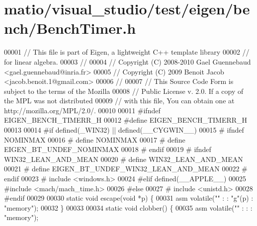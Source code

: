 \hypertarget{matio_2visual__studio_2test_2eigen_2bench_2_bench_timer_8h_source}{}\section{matio/visual\+\_\+studio/test/eigen/bench/\+Bench\+Timer.h}
\label{matio_2visual__studio_2test_2eigen_2bench_2_bench_timer_8h_source}

\begin{DoxyCode}
00001 \textcolor{comment}{// This file is part of Eigen, a lightweight C++ template library}
00002 \textcolor{comment}{// for linear algebra.}
00003 \textcolor{comment}{//}
00004 \textcolor{comment}{// Copyright (C) 2008-2010 Gael Guennebaud <gael.guennebaud@inria.fr>}
00005 \textcolor{comment}{// Copyright (C) 2009 Benoit Jacob <jacob.benoit.1@gmail.com>}
00006 \textcolor{comment}{//}
00007 \textcolor{comment}{// This Source Code Form is subject to the terms of the Mozilla}
00008 \textcolor{comment}{// Public License v. 2.0. If a copy of the MPL was not distributed}
00009 \textcolor{comment}{// with this file, You can obtain one at http://mozilla.org/MPL/2.0/.}
00010 
00011 \textcolor{preprocessor}{#ifndef EIGEN\_BENCH\_TIMERR\_H}
00012 \textcolor{preprocessor}{#define EIGEN\_BENCH\_TIMERR\_H}
00013 
00014 \textcolor{preprocessor}{#if defined(\_WIN32) || defined(\_\_CYGWIN\_\_)}
00015 \textcolor{preprocessor}{# ifndef NOMINMAX}
00016 \textcolor{preprocessor}{#   define NOMINMAX}
00017 \textcolor{preprocessor}{#   define EIGEN\_BT\_UNDEF\_NOMINMAX}
00018 \textcolor{preprocessor}{# endif}
00019 \textcolor{preprocessor}{# ifndef WIN32\_LEAN\_AND\_MEAN}
00020 \textcolor{preprocessor}{#   define WIN32\_LEAN\_AND\_MEAN}
00021 \textcolor{preprocessor}{#   define EIGEN\_BT\_UNDEF\_WIN32\_LEAN\_AND\_MEAN}
00022 \textcolor{preprocessor}{# endif}
00023 \textcolor{preprocessor}{# include <windows.h>}
00024 \textcolor{preprocessor}{#elif defined(\_\_APPLE\_\_)}
00025 \textcolor{preprocessor}{#include <mach/mach\_time.h>}
00026 \textcolor{preprocessor}{#else}
00027 \textcolor{preprocessor}{# include <unistd.h>}
00028 \textcolor{preprocessor}{#endif}
00029 
00030 \textcolor{keyword}{static} \textcolor{keywordtype}{void} escape(\textcolor{keywordtype}{void} *p) \{
00031   \textcolor{keyword}{asm} \textcolor{keyword}{volatile}(\textcolor{stringliteral}{""} : : \textcolor{stringliteral}{"g"}(p) : \textcolor{stringliteral}{"memory"});
00032 \}
00033 
00034 \textcolor{keyword}{static} \textcolor{keywordtype}{void} clobber() \{
00035   \textcolor{keyword}{asm} \textcolor{keyword}{volatile}(\textcolor{stringliteral}{""} : : : \textcolor{stringliteral}{"memory"});

\end{DoxyCode}
